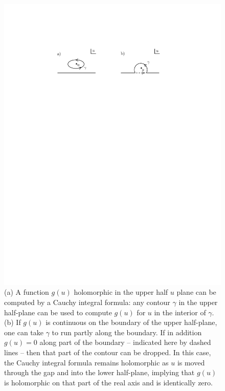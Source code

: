 \documentclass[12pt]{article}
\numberwithin{equation}{section}
\begin{document}
\begin{figure}
 \begin{center}
   \includegraphics[width=5.5in]{Fig1.pdf}
 \end{center}
\caption{\small (a)  A function $g(u)$ holomorphic in the upper half $u$ plane can be computed by a Cauchy integral formula: any contour
$\gamma$ in the upper half-plane can be used to compute $g(u)$ for $u$ in the interior of $\gamma$.   (b) If $g(u)$ is continuous
on the boundary of the upper half-plane, one can take $\gamma$ to run partly along the boundary.  If in addition $g(u)=0$ along
part of the boundary -- indicated here by dashed lines -- then that part of the contour can be dropped.  In this case, the Cauchy integral
formula remains holomorphic as $u$ is moved through the gap and into the lower half-plane, implying that $g(u)$ is holomorphic
on that part of the real axis and  is identically zero. \label{Fig1}}
\end{figure}
\end{document}
